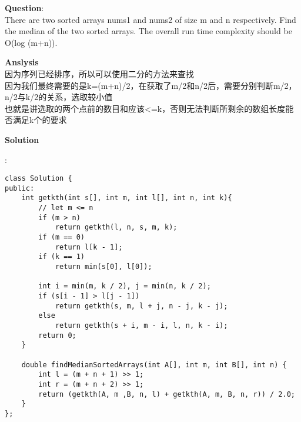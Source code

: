     
\begin{description}
    \item{\textbf{Question}}:\\%
		There are two sorted arrays nums1 and nums2 of size m and n respectively. Find the median of the two sorted arrays. The overall run time complexity should be O(log (m+n)).\\

    \item{\textbf{Anslysis}}\\
		因为序列已经排序，所以可以使用二分的方法来查找\\
		因为我们最终需要的是k=(m+n)/2，在获取了m/2和n/2后，需要分别判断m/2，n/2与k/2的关系，选取较小值\\
		也就是讲选取的两个点前的数目和应该<=k，否则无法判断所剩余的数组长度能否满足k个的要求\\

    \item{\textbf{Solution}}\\
	\item{} : \\
		\begin{lstlisting}
class Solution {
public:
    int getkth(int s[], int m, int l[], int n, int k){
        // let m <= n
        if (m > n) 
            return getkth(l, n, s, m, k);
        if (m == 0)
            return l[k - 1];
        if (k == 1)
            return min(s[0], l[0]);

        int i = min(m, k / 2), j = min(n, k / 2);
        if (s[i - 1] > l[j - 1])
            return getkth(s, m, l + j, n - j, k - j);
        else
            return getkth(s + i, m - i, l, n, k - i);
        return 0;
    }

    double findMedianSortedArrays(int A[], int m, int B[], int n) {
        int l = (m + n + 1) >> 1;
        int r = (m + n + 2) >> 1;
        return (getkth(A, m ,B, n, l) + getkth(A, m, B, n, r)) / 2.0;
    }
};		\end{lstlisting}

\end{description}

